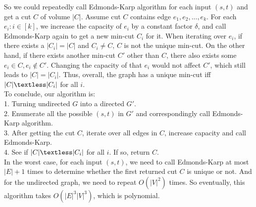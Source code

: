 \documentclass[titlepage, paper=a4, fontsize=11pt]{scrartcl} %
\numberwithin{equation}{section} %
\numberwithin{figure}{section} %
\numberwithin{table}{section} %
\numberwithin{figure}{section}
\begin{document}
So we could repeatedly call Edmonds-Karp algorithm for each input $(s, t)$ and get a cut $C$ of volume $|C|$. Assume cut $C$ contains edge $e_1, e_2, ... , e_k$. For each $e_i: i \in [k]$, we increase the capacity of $e_i$ by a constant factor $\delta$, and call Edmonds-Karp again to get a new min-cut $C_i$ for it. When iterating over $e_i$, if there exists a $|C_i|=|C|$ and $C_i \neq C$, $C$ is not the unique min-cut. On the other hand, if there exists another min-cut $C'$ other than $C$, there also exists some $e_i \in C, e_i \notin C'$. Changing the capacity of that $e_i$ would not affect $C'$, which still leads to $|C|=|C_i|$. Thus, overall, the graph has a unique min-cut iff $|C| \textless |C_i|$ for all $i$. \\

To conclude, our algorithm is: \\
1. Turning undirected $G$ into a directed $G'$. \\
2. Enumerate all the possible $(s, t)$ in $G'$ and correspondingly call Edmonds-Karp algorithm. \\
3. After getting the cut $C$, iterate over all edges in $C$, increase capacity and call Edmonds-Karp. \\
4. See if $|C| \textless |C_i|$ for all $i$. If so, return $C$. \\

In the worst case, for each input $(s, t)$, we need to call Edmonds-Karp at most $|E|+1$ times to determine whether the first returned cut $C$ is unique or not. And for the undirected graph, we need to repeat $O(|V|^2)$ times. So eventually, this algorithm takes $O(|E|^3|V|^3)$, which is polynomial. \\



\end{document}
